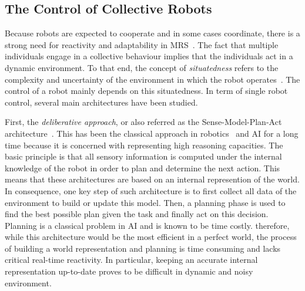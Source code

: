 


  \subsection{The Control of Collective Robots}

    Because robots are expected to cooperate and in some cases coordinate, there is a strong need for reactivity and adaptability in MRS~\parencite{Iocchi2001, Farinelli2004}. The fact that multiple individuals engage in a collective behaviour implies that the individuals act in a dynamic environment. To that end, the concept of \emph{situatedness} refers to the complexity and uncertainty of the environment in which the robot operates~\parencite{Mataric2008}. The control of a robot mainly depends on this situatedness. In term of single robot control, several main architectures have been studied.

    First, the \emph{deliberative approach}, or also referred as the Sense-Model-Plan-Act architecture~\parencite{Albus1991, Iocchi2001, Mataric2008}. This has been the classical approach in robotics~\parencite{Nilsson1984} and AI for a long time because it is concerned with representing high reasoning capacities. The basic principle is that all sensory information is computed under the internal knowledge of the robot in order to plan and determine the next action. This means that these architectures are based on an internal represention of the world. In consequence, one key step of such architecture is to first collect all data of the environment to build or update this model. Then, a planning phase is used to find the best possible plan given the task and finally act on this decision. Planning is a classical problem in AI and is known to be time costly. therefore, while this architecture would be the most efficient in a perfect world, the process of building a world representation and planning is time consuming and lacks critical real-time reactivity. In particular, keeping an accurate internal representation up-to-date proves to be difficult in dynamic and noisy environment.


